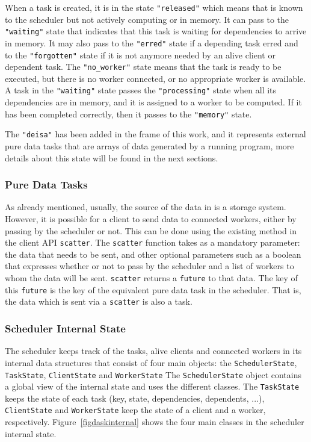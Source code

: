 When a task is created, it is in the state \texttt{"released"} which means that is known to the scheduler but not actively computing or in memory. It can pass to the \texttt{"waiting"} state that indicates that this task is waiting for dependencies to arrive in memory. It may also pass to the \texttt{"erred"} state if a depending task erred and to the \texttt{"forgotten"} state if it is not anymore needed by an alive client or dependent task. The \texttt{"no\_worker"} state means that the task is ready to be executed, but there is no worker connected, or no appropriate worker is available. 
A task in the \texttt{"waiting"} state passes the \texttt{"processing"} state when all its dependencies are in memory, and it is assigned to a worker to be computed. If it has been completed correctly, then it passes to the \texttt{"memory"} state. 

The \texttt{"deisa"} has been added in the frame of this work, and it represents external pure data tasks that are arrays of data generated by a running program, more details about this state will be found in the next sections. 

\subsubsection{Pure Data Tasks}
As already mentioned, usually, the source of the data in \dask is a storage system. However, it is possible for a client to send data to connected workers, either by passing by the scheduler or not. This can be done using the existing method in the client API \texttt{scatter}. The \texttt{scatter} function takes as a mandatory parameter: the data that needs to be sent, and other optional parameters such as a boolean that expresses whether or not to pass by the scheduler and a list of workers to whom the data will be sent. 
\texttt{scatter} returns a \texttt{future} to that data. The key of this \texttt{future} is the key of the equivalent pure data task in the \dask scheduler. That is, the data which is sent via a \texttt{scatter} is also a task.


\subsubsection{Scheduler Internal State}

The scheduler keeps track of the tasks, alive clients and connected workers in its internal data structures that consist of four main objects: the \texttt{SchedulerState}, \texttt{TaskState}, \texttt{ClientState} and \texttt{WorkerState}
The \texttt{SchedulerState} object contains a global view of the internal state and uses the different classes. The \texttt{TaskState} keeps the state of each task (key, state, dependencies, dependents, ...), \texttt{ClientState} and \texttt{WorkerState} keep the state of a client and a worker, respectively.
Figure~\ref{figdaskinternal} shows the four main classes in the \dask scheduler internal state. 

